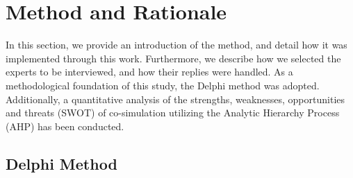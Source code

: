 \section{Method and Rationale}

In this section, we provide an introduction of the method, and detail how it was implemented through this work. 
Furthermore, we describe how we selected the experts to be interviewed, and how their replies were handled.
As a methodological foundation of this study, the Delphi method \cite{Dalkey1963} was adopted. 
Additionally, a quantitative analysis of the strengths, weaknesses, opportunities and threats (SWOT) of co-simulation utilizing the Analytic Hierarchy Process (AHP) has been conducted.




\subsection{Delphi Method}

